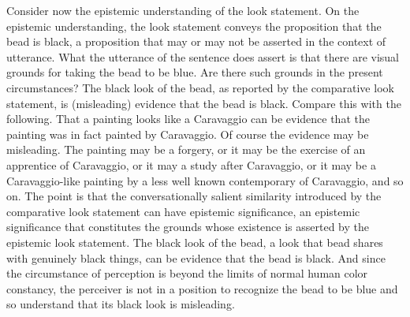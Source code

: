 \documentclass[12pt]{article}
\begin{document}
Consider now the epistemic understanding of the look statement. On the epistemic understanding, the look statement conveys the proposition that the bead is black, a proposition that may or may not be asserted in the context of utterance. What the utterance of the sentence does assert is that there are visual grounds for taking the bead to be blue. Are there such grounds in the present circumstances? The black look of the bead, as reported by the comparative look statement, is (misleading) evidence that the bead is black. Compare this with the following. That a painting looks like a Caravaggio can be evidence that the painting was in fact painted by Caravaggio. Of course the evidence may be misleading. The painting may be a forgery, or it may be the exercise of an apprentice of Caravaggio, or it may a study after Caravaggio, or it may be a Caravaggio-like painting by a less well known contemporary of Caravaggio, and so on. The point is that the conversationally salient similarity introduced by the comparative look statement can have epistemic significance, an epistemic significance that constitutes the grounds whose existence is asserted by the epistemic look statement. The black look of the bead, a look that bead shares with genuinely black things, can be evidence that the bead is black. And since the circumstance of perception is beyond the limits of normal human color constancy, the perceiver is not in a position to recognize the bead to be blue and so understand that its black look is misleading. 
\end{document}
